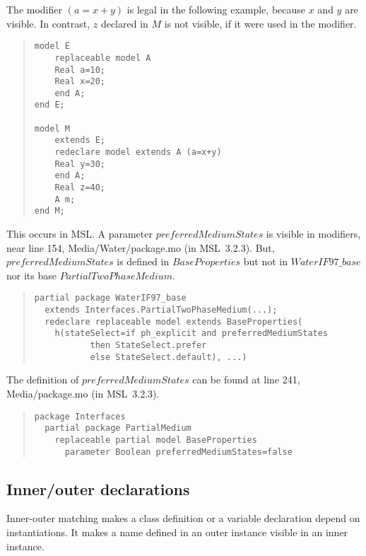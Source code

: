 \documentclass[10pt,b5paper]{article}
\begin{document}
The modifier $(a=x+y)$ is legal in the following example, because $x$
and $y$ are visible.  In contrast, $z$ declared in $M$ is not visible,
if it were used in the modifier.

\begin{quote}
\begin{lstlisting}[aboveskip=-\baselineskip]
model E
    replaceable model A
	Real a=10;
	Real x=20;
    end A;
end E;

model M
    extends E;
    redeclare model extends A (a=x+y)
	Real y=30;
    end A;
    Real z=40;
    A m;
end M;
\end{lstlisting}
\end{quote}

This occurs in MSL.  A parameter $\mathit{preferredMediumStates}$ is
visible in modifiers, near line 154, Media/Water/package.mo (in
MSL~3.2.3).  But, $\mathit{preferredMediumStates}$ is defined in
$\mathit{BaseProperties}$ but not in $\mathit{WaterIF97\_base}$ nor
its base $\mathit{PartialTwoPhaseMedium}$.

\begin{quote}
\begin{lstlisting}[aboveskip=-\baselineskip]
partial package WaterIF97_base
  extends Interfaces.PartialTwoPhaseMedium(...);
  redeclare replaceable model extends BaseProperties(
    h(stateSelect=if ph_explicit and preferredMediumStates
           then StateSelect.prefer
           else StateSelect.default), ...)
\end{lstlisting}
\end{quote}

The definition of $\mathit{preferredMediumStates}$ can be found at
line 241, Media/package.mo (in MSL~3.2.3).

\begin{quote}
\begin{lstlisting}[aboveskip=-\baselineskip]
package Interfaces
  partial package PartialMedium
    replaceable partial model BaseProperties
      parameter Boolean preferredMediumStates=false
\end{lstlisting}
\end{quote}


\subsection{Inner/outer declarations}

Inner-outer matching makes a class definition or a variable
declaration depend on instantiations.  It makes a name defined in an
outer instance visible in an inner instance.
\end{document}
